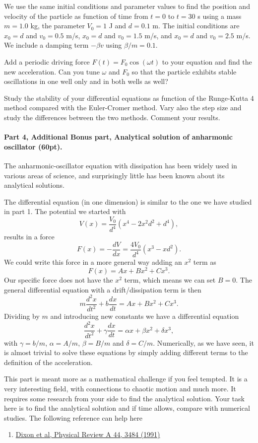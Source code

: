 \documentclass[%
oneside,                 %
final,                   %
10pt]{article}
\begin{document}
We use the same initial conditions and parameter values to find the position and velocity of the particle as function of time from $t=0$ to $t=30$ s using a mass  $m=1.0$ kg, the parameter $V_0=1$ J and $d=0.1$ m.  The  initial conditions are $x_0=d$ and $v_0=0.5$ m/s, $x_0=d$ and $v_0=1.5$ m/s, and $x_0=d$ and $v_0=2.5$ m/s. We include a damping term
$-\beta v$ using $\beta/m=0.1$.

Add a periodic driving force $F(t)=F_0\cos{(\omega t)}$  to your equation and find the new acceleration. Can you tune
$\omega$ and $F_0$ so that the particle exhibits stable oscillations in one well only and in both wells as well?

Study the stability of your differential equations as function of the Runge-Kutta 4 method compared with the Euler-Cromer method. Vary also the step size and study the differences between the two methods. Comment your results.

\paragraph{Part 4, Additional Bonus part, Analytical solution of anharmonic oscillator (60pt).}
The anharmonic-oscillator equation with dissipation has been widely used in various areas of science,
and surprisingly little has been known about its analytical solutions.

The differential equation (in one dimension) is similar to the one we have studied in part 1.
The potential we started with
\[
V(x)=\frac{V_0}{d^4}\left(x^4-2x^2d^2+d^4\right),
\]
results in a force
\[
F(x)=-\frac{dV}{dx}=\frac{4V_0}{d^4}\left(x^3-xd^2\right).
\]
We could write this force in a more general way adding an $x^2$ term as
\[
F(x)=Ax+Bx^2+Cx^3.
\]
Our specific force does not have the $x^2$ term, which means we can set $B=0$.
The general differential equation with a drift/dissipation term is then
\[
m\frac{d^2x}{dt^2}+b\frac{dx}{dt}=Ax+Bx^2+Cx^3.
\]
Dividing by $m$ and introducing new constants we have a differential equation
\[
\frac{d^2x}{dt^2}+\gamma\frac{dx}{dt}=\alpha x+\beta x^2+\delta x^3,
\]
with $\gamma=b/m$, $\alpha=A/m$, $\beta=B/m$ and $\delta=C/m$.
Numerically, as we have seen, it is almost trivial to solve these equations by simply adding different terms to the definition of the acceleration.

This part is meant more as a mathematical challenge if you feel tempted. It is a very interesting field, with connections to chaotic motion and much more. It requires some research from your side to find the analytical solution.  Your task here is to find the analytical solution and if time allows, compare with numerical studies. 
The following reference can help here
\begin{enumerate}
\item \href{{https://journals.aps.org/pra/pdf/10.1103/PhysRevA.44.3484}}{Dixon et al, Physical Review A 44, 3484 (1991)}
\end{enumerate}

\noindent

\end{document}
